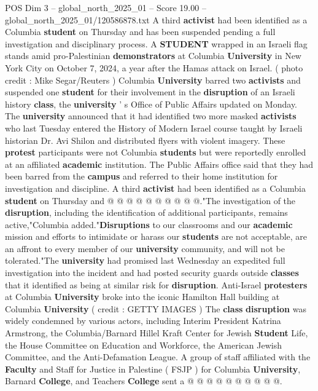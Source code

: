 \begin{textsample}{POS Dim 3 – global\_north\_2025\_01 – Score 19.00 – global\_north\_2025\_01/120586878.txt}  \label{ex:f3_pos_242}
A third \textbf{activist} had been identified as a Columbia \textbf{student} on Thursday and has been suspended pending a full investigation and disciplinary process.
A \textbf{STUDENT} wrapped in an Israeli flag stands amid pro-Palestinian \textbf{demonstrators} at Columbia \textbf{University} in New York City on October 7, 2024, a year after the Hamas attack on Israel. ( photo credit : Mike Segar/Reuters ) Columbia \textbf{University} barred two \textbf{activists} and suspended one \textbf{student} for their involvement in the \textbf{disruption} of an Israeli history \textbf{class}, the \textbf{university} ' s Office of Public Affairs updated on Monday.
The \textbf{university} announced that it had identified two more masked \textbf{activists} who last Tuesday entered the History of Modern Israel course taught by Israeli historian Dr.
Avi Shilon and distributed flyers with violent imagery.
These \textbf{protest} participants were not Columbia \textbf{students} but were reportedly enrolled at an affiliated \textbf{academic} institution.
The Public Affairs office said that they had been barred from the \textbf{campus} and referred to their home institution for investigation and discipline.
A third \textbf{activist} had been identified as a Columbia \textbf{student} on Thursday and @ @ @ @ @ @ @ @ @ @."The investigation of the \textbf{disruption}, including the identification of additional participants, remains active,"Columbia added."\textbf{Disruptions} to our classrooms and our \textbf{academic} mission and efforts to intimidate or harass our \textbf{students} are not acceptable, are an affront to every member of our \textbf{university} community, and will not be tolerated."The \textbf{university} had promised last Wednesday an expedited full investigation into the incident and had posted security guards outside \textbf{classes} that it identified as being at similar risk for \textbf{disruption}.
Anti-Israel \textbf{protesters} at Columbia \textbf{University} broke into the iconic Hamilton Hall building at Columbia \textbf{University} ( credit : GETTY IMAGES ) The \textbf{class} \textbf{disruption} was widely condemned by various actors, including Interim President Katrina Armstrong, the Columbia/Barnard Hillel Kraft Center for Jewish \textbf{Student} Life, the House Committee on Education and Workforce, the American Jewish Committee, and the Anti-Defamation League.
A group of staff affiliated with the \textbf{Faculty} and Staff for Justice in Palestine ( FSJP ) for Columbia \textbf{University}, Barnard \textbf{College}, and Teachers \textbf{College} sent a @ @ @ @ @ @ @ @ @ @.

\end{textsample}
